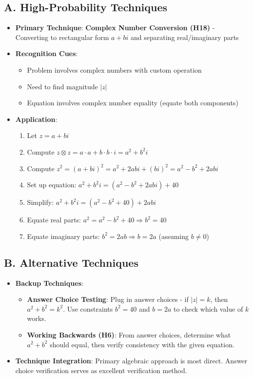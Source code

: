 \documentclass[12pt]{article}
\begin{document}
\begin{techniquesbox}
\subsection*{A. High-Probability Techniques}
\begin{itemize}[leftmargin=*]
    \item \textbf{Primary Technique}: \textbf{Complex Number Conversion (H18)} - Converting to rectangular form $a+bi$ and separating real/imaginary parts
    \item \textbf{Recognition Cues}: 
    \begin{itemize}
        \item Problem involves complex numbers with custom operation
        \item Need to find magnitude $|z|$
        \item Equation involves complex number equality (equate both components)
    \end{itemize}
    \item \textbf{Application}: 
    \begin{enumerate}
        \item Let $z = a+bi$
        \item Compute $z \otimes z = a \cdot a + b \cdot b \cdot i = a^2 + b^2i$
        \item Compute $z^2 = (a+bi)^2 = a^2 + 2abi + (bi)^2 = a^2 - b^2 + 2abi$
        \item Set up equation: $a^2 + b^2i = (a^2 - b^2 + 2abi) + 40$
        \item Simplify: $a^2 + b^2i = (a^2 - b^2 + 40) + 2abi$
        \item Equate real parts: $a^2 = a^2 - b^2 + 40 \Rightarrow b^2 = 40$
        \item Equate imaginary parts: $b^2 = 2ab \Rightarrow b = 2a$ (assuming $b \neq 0$)
    \end{enumerate}
\end{itemize}

\subsection*{B. Alternative Techniques}
\begin{itemize}[leftmargin=*]
    \item \textbf{Backup Techniques}: 
    \begin{itemize}
        \item \textbf{Answer Choice Testing}: Plug in answer choices - if $|z| = k$, then $a^2 + b^2 = k^2$. Use constraints $b^2 = 40$ and $b = 2a$ to check which value of $k$ works.
        \item \textbf{Working Backwards (H6)}: From answer choices, determine what $a^2+b^2$ should equal, then verify consistency with the given equation.
    \end{itemize}
    \item \textbf{Technique Integration}: Primary algebraic approach is most direct. Answer choice verification serves as excellent verification method.
\end{itemize}
\end{techniquesbox}
\end{document}
